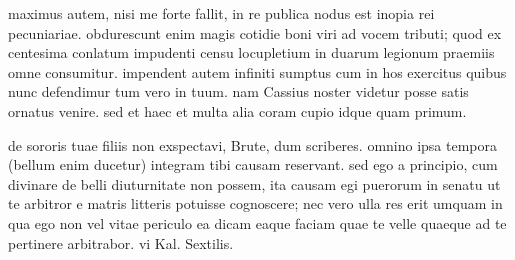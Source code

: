  maximus autem, nisi me forte fallit, in re publica nodus est inopia rei pecuniariae. obdurescunt enim magis cotidie boni viri ad vocem tributi; quod ex centesima conlatum impudenti censu locupletium in duarum legionum praemiis omne consumitur. impendent autem infiniti sumptus cum in hos exercitus quibus nunc defendimur tum vero in tuum. nam Cassius noster videtur posse satis ornatus venire. sed et haec et multa alia coram cupio idque quam primum.

 de sororis tuae filiis non exspectavi, Brute, dum scriberes. omnino ipsa tempora (bellum enim ducetur) integram tibi causam reservant. sed ego a principio, cum divinare de belli diuturnitate non possem, ita causam egi puerorum in senatu ut te arbitror e matris litteris potuisse cognoscere; nec vero ulla res erit umquam in qua ego non vel vitae periculo ea dicam eaque faciam quae te velle quaeque ad te pertinere arbitrabor. vi Kal. Sextilis.

